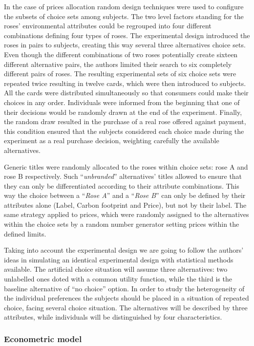 \documentclass[12pt,]{article}
\begin{document}
In the case of prices allocation random design techniques were used to
configure the subsets of choice sets among subjects. The two level
factors standing for the roses' environmental attributes could be
regrouped into four different combinations defining four types of roses.
The experimental design introduced the roses in pairs to subjects,
creating this way several three alternatives choice sets. Even though
the different combinations of two roses potentially create sixteen
different alternative pairs, the authors limited their search to six
completely different pairs of roses. The resulting experimental sets of
six choice sets were repeated twice resulting in twelve cards, which
were then introduced to subjects. All the cards were distributed
simultaneously so that consumers could make their choices in any order.
Individuals were informed from the beginning that one of their decisions
would be randomly drawn at the end of the experiment. Finally, the
random draw resulted in the purchase of a real rose offered against
payment, this condition ensured that the subjects considered each choice
made during the experiment as a real purchase decision, weighting
carefully the available alternatives.

Generic titles were randomly allocated to the roses within choice sets:
rose A and rose B respectively. Such ``\emph{unbranded}'' alternatives'
titles allowed to ensure that they can only be differentiated according
to their attribute combinations. This way the choice between a
``\emph{Rose A}'' and a ``\emph{Rose B}'' can only be defined by their
attributes alone (Label, Carbon footprint and Price), but not by their
label. The same strategy applied to prices, which were randomly assigned
to the alternatives within the choice sets by a random number generator
setting prices within the defined limits.

Taking into account the experimental design we are going to follow the
authors' ideas in simulating an identical experimental design with
statistical methods available. The artificial choice situation will
assume three alternatives: two unlabelled ones doted with a common
utility function, while the third is the baseline alternative of ``no
choice'' option. In order to study the heterogeneity of the individual
preferences the subjects should be placed in a situation of repeated
choice, facing several choice situation. The alternatives will be
described by three attributes, while individuals will be distinguished
by four characteristics.

\hypertarget{econometric-model}{%
\subsubsection{Econometric model}\label{econometric-model}}
\end{document}
